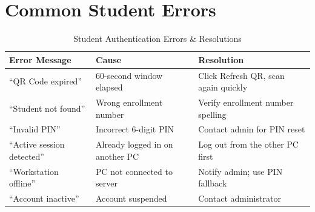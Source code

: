 \section{Common Student Errors}

\begin{table}[h!]
\centering
\caption{Student Authentication Errors \& Resolutions}
\label{tab:student-errors}
\begin{tabularx}{\textwidth}{lXX}
\toprule
\textbf{Error Message} & \textbf{Cause} & \textbf{Resolution}\\
\midrule
\rowcolor{aurxonlightgray}
``QR Code expired'' & 60-second window elapsed & Click Refresh QR, scan again quickly\\
``Student not found'' & Wrong enrollment number & Verify enrollment number spelling\\
\rowcolor{aurxonlightgray}
``Invalid PIN'' & Incorrect 6-digit PIN & Contact admin for PIN reset\\
``Active session detected'' & Already logged in on another PC & Log out from the other PC first\\
\rowcolor{aurxonlightgray}
``Workstation offline'' & PC not connected to server & Notify admin; use PIN fallback\\
``Account inactive'' & Account suspended & Contact administrator\\
\bottomrule
\end{tabularx}
\end{table}
